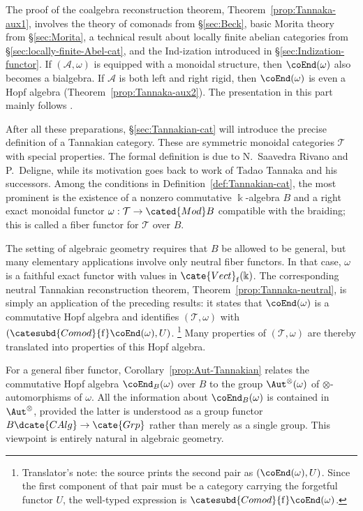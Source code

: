 The proof of the coalgebra reconstruction theorem,
Theorem~\ref{prop:Tannaka-aux1}, involves the theory of comonads from
\S\ref{sec:Beck}, basic Morita theory from \S\ref{sec:Morita}, a technical
result about locally finite abelian categories from
\S\ref{sec:locally-finite-Abel-cat}, and the Ind-ization introduced in
\S\ref{sec:Indization-functor}. If $(\mathcal{A},\omega)$ is equipped with
a monoidal structure, then $\coEnd(\omega)$ also becomes a bialgebra. If
$\mathcal{A}$ is both left and right rigid, then $\coEnd(\omega)$ is even a
Hopf algebra (Theorem~\ref{prop:Tannaka-aux2}). The presentation in this part
mainly follows \cite{Del90}.

After all these preparations, \S\ref{sec:Tannakian-cat} will introduce the
precise definition of a Tannakian category. These are symmetric monoidal
categories $\mathcal{T}$ with special properties. The formal definition is
due to N.\ Saavedra Rivano and P.\ Deligne, while its motivation goes back
to work of Tadao Tannaka and his successors. Among the conditions in
Definition~\ref{def:Tannakian-cat}, the most prominent is the existence of a
nonzero commutative $\Bbbk$-algebra $B$ and a right exact monoidal functor
$\omega:\mathcal{T}\to\cated{Mod}B$ compatible with the braiding; this is
called a fiber functor for $\mathcal{T}$ over $B$.

The setting of algebraic geometry requires that $B$ be allowed to be
general, but many elementary applications involve only neutral fiber
functors. In that case, $\omega$ is a faithful exact functor with values in
$\cate{Vect}_{\mathrm{f}}(\Bbbk)$. The corresponding neutral Tannakian
reconstruction theorem, Theorem~\ref{prop:Tannaka-neutral}, is simply an
application of the preceding results: it states that $\coEnd(\omega)$ is a
commutative Hopf algebra and identifies $(\mathcal{T},\omega)$ with
$(\catesubd{Comod}{\mathrm{f}}\coEnd(\omega),U)$.
\footnote{Translator's note: the source prints the second pair as
$(\coEnd(\omega),U)$. Since the first component of that pair must be a
category carrying the forgetful functor $U$, the well-typed expression is
$\catesubd{Comod}{\mathrm{f}}\coEnd(\omega)$.}
Many properties of $(\mathcal{T},\omega)$ are thereby translated into
properties of this Hopf algebra.

For a general fiber functor, Corollary~\ref{prop:Aut-Tannakian} relates the
commutative Hopf algebra $\coEnd_B(\omega)$ over $B$ to the group
$\Aut^\otimes(\omega)$ of $\otimes$-automorphisms of $\omega$. All the
information about $\coEnd_B(\omega)$ is contained in $\Aut^\otimes$, provided
the latter is understood as a group functor
$B\dcate{CAlg}\to\cate{Grp}$ rather than merely as a single group. This
viewpoint is entirely natural in algebraic geometry.

